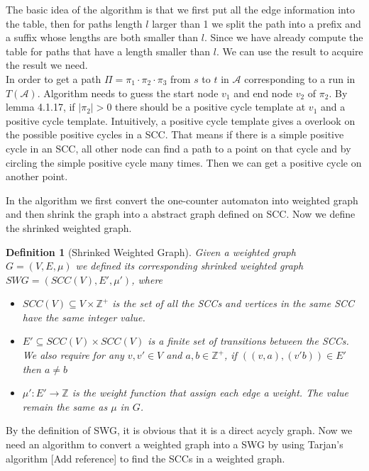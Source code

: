 \documentclass{article}
\newtheorem{definition}{Definition}
\begin{document}
The basic idea of the algorithm is that we first put all the edge information into the table, then for paths length $l$ larger than 1 we split the path into a prefix and a suffix  whose lengths are both smaller than $l$. Since we have already compute the table for paths that have a length smaller than $l$. We can use the result to acquire the result we need.\\



In order to get a path $\Pi= \pi_1\cdot \pi_2 \cdot \pi_3$ from $s$ to $t$ in   $\mathcal{A}$ corresponding to a run in $T(\mathcal{A})$. Algorithm needs to guess the start node $v_1$ and end node $v_2$ of $\pi_2$. By lemma 4.1.17, if $|\pi_2| > 0$ there should be a  positive cycle template at $v_1$ and a positive cycle template. Intuitively, a positive cycle template gives a overlook on the possible positive cycles in a SCC. That means if there is a simple positive cycle in an SCC, all other node can find a path to a point on that cycle and by circling the simple positive cycle many times. Then we can get a positive cycle on another point.

In the algorithm we first convert the one-counter automaton into weighted graph and then shrink the graph into a abstract graph defined on SCC. Now we define the shrinked weighted graph.

\begin{definition}[Shrinked Weighted Graph]
Given a weighted graph $G = (V, E, \mu)$ we defined its corresponding shrinked weighted graph $SWG = (SCC(V), E', \mu')$, where
\begin{itemize}
\item $SCC(V) \subseteq V\times \mathbb{Z}^+$ is the set of all the SCCs and vertices in the same SCC have the same integer value.

\item $E'\subseteq SCC(V) \times SCC(V)$ is a finite set of transitions between the SCCs. We also require for any $v,v'\in V$ and $a,b \in \mathbb{Z}^+$, if $((v,a), (v'b)) \in E'$ then $a \ne b$

\item $\mu': E' \rightarrow \mathbb{Z}$ is the weight function that assign each edge a weight. The value remain the same as $\mu$ in $G$.
\end{itemize}

\end{definition}

By the definition of SWG, it is obvious that it is a direct acycly graph. Now we need an algorithm to convert a weighted graph into a SWG by using Tarjan's algorithm [Add reference] to find the SCCs in a weighted graph.
\end{document}
